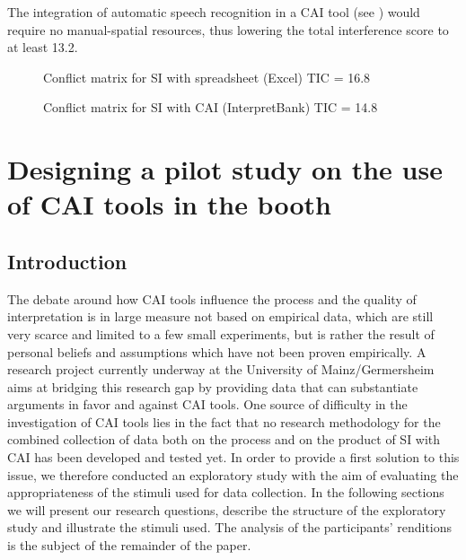 \documentclass[output=paper]{langsci/langscibook}
\begin{document}
The integration of automatic speech recognition in a \textsc{CAI} tool (see \citealp{Fantinuoli2017b}) would require no manual-spatial resources, thus lowering the total interference score to at least 13.2.

\begin{figure}
\caption{Conflict matrix for \textsc{SI} with spreadsheet (Excel) TIC = 16.8\label{fig:prandi:7}}
\end{figure}

\begin{figure}
\caption{Conflict matrix for \textsc{SI} with \textsc{CAI} (InterpretBank) TIC = 14.8\label{fig:prandi:6}}
\end{figure}

\section{Designing a pilot study on the use of \textsc{CAI} tools in the booth}\label{sec:prandi:3}
\subsection{Introduction}\label{sec:prandi:3.1}
The debate around how \textsc{CAI} tools influence the process and the quality of interpretation is in large measure not based on empirical data, which are still very scarce and limited to a few small experiments, but is rather the result of personal beliefs and assumptions which have not been proven empirically. A research project currently underway at the University of Mainz/Germersheim \citep{Prandi2016, Prandi2017a, Prandi2017b} aims at bridging this research gap by providing data that can substantiate arguments in favor and against \textsc{CAI} tools. One source of difficulty in the investigation of \textsc{CAI} tools lies in the fact that no research methodology for the combined collection of data both on the process and on the product of \textsc{SI} with \textsc{CAI} has been developed and tested yet. In order to provide a first solution to this issue, we therefore conducted an exploratory study with the aim of evaluating the appropriateness of the stimuli used for data collection. In the following sections we will present our research questions, describe the structure of the exploratory study and illustrate the stimuli used. The analysis of the participants’ renditions is the subject of the remainder of the paper.
\end{document}
